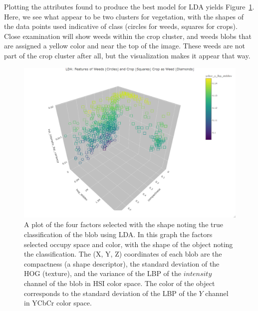 \documentclass[letterpaper, notitlepage]{report}
\begin{document}
 

Plotting the attributes found to produce the best model for LDA yields Figure~\ref{fig:factors}. Here, we see what appear to be two clusters for vegetation, with the shapes of the data points used indicative of class (circles for weeds, squares for crops).  Close examination will show weeds within the crop cluster, and weeds blobs that are assigned a yellow color and near the top of the image. These weeds are not part of the crop cluster after all, but the visualization makes it appear that way.

 \begin{figure}[H]
	\centering
	\includegraphics[width=0.9\linewidth]{./figures/plot-factors.png}
	\caption[Factors selected for discrimination]{A plot of the four factors selected with the shape noting the true classification of the blob using LDA. In this graph the factors selected occupy space and color, with the shape of the object noting the classification. The (X, Y, Z) coordinates of each blob are the compactness (a shape descriptor), the standard deviation of the HOG (texture), and the variance of the LBP of the $intensity$ channel of the blob in HSI color space. The color of the object corresponds to the standard deviation of the LBP of the $Y$ channel in YCbCr color space.}
	\label{fig:factors}
\end{figure}
\end{document}
